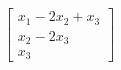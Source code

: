 \documentclass[preview]{standalone}
\begin{document}
\begin{align*}
\begin{bmatrix} x_1 - 2x_2 + x_3 \\ x_2 - 2x_3 \\ x_3 \end{bmatrix}
\end{align*}
\end{document}
